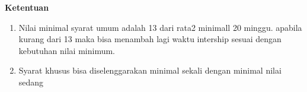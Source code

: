 \textbf {Ketentuan}
\begin{enumerate}
  \item Nilai minimal syarat umum adalah 13 dari rata2 minimall 20 minggu. apabila kurang dari 13 maka bisa menambah lagi waktu intership sesuai dengan kebutuhan nilai minimum.
  \item Syarat khusus bisa diselenggarakan minimal sekali dengan minimal nilai sedang
\end{enumerate} 

